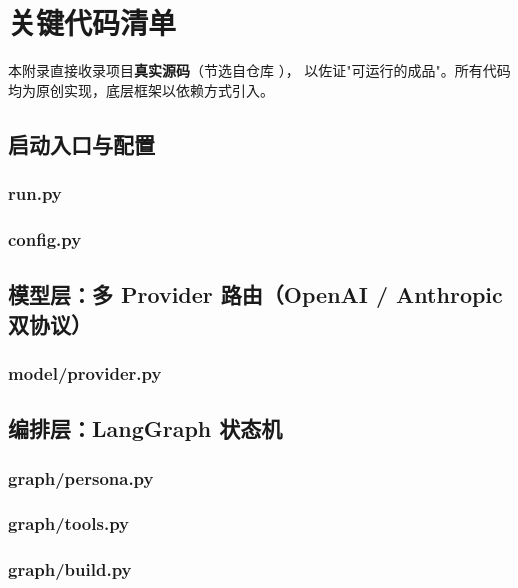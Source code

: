 \chapter{关键代码清单}
\noindent 本附录直接收录项目\textbf{真实源码}（节选自仓库 ），
以佐证"可运行的成品"。所有代码均为原创实现，底层框架以依赖方式引入。

\section{启动入口与配置}
\subsection{run.py}

\subsection{config.py}


\section{模型层：多 Provider 路由（OpenAI / Anthropic 双协议）}
\subsection{model/provider.py}


\section{编排层：LangGraph 状态机}
\subsection{graph/persona.py}

\subsection{graph/tools.py}

\subsection{graph/build.py}



